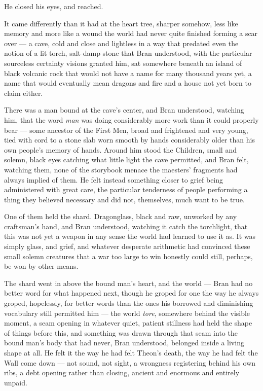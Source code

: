 He closed his eyes, and reached.

\sceneBreak

It came differently than it had at the heart tree, sharper somehow, less like memory and more like a wound the world had never quite finished forming a scar over — a cave, cold and close and lightless in a way that predated even the notion of a lit torch, salt-damp stone that Bran understood, with the particular sourceless certainty visions granted him, sat somewhere beneath an island of black volcanic rock that would not have a name for many thousand years yet, a name that would eventually mean dragons and fire and a house not yet born to claim either.

There was a man bound at the cave’s center, and Bran understood, watching him, that the word \textit{man} was doing considerably more work than it could properly bear — some ancestor of the First Men, broad and frightened and very young, tied with cord to a stone slab worn smooth by hands considerably older than his own people’s memory of hands. Around him stood the Children, small and solemn, black eyes catching what little light the cave permitted, and Bran felt, watching them, none of the storybook menace the maesters’ fragments had always implied of them. He felt instead something closer to grief being administered with great care, the particular tenderness of people performing a thing they believed necessary and did not, themselves, much want to be true.

One of them held the shard. Dragonglass, black and raw, unworked by any craftsman’s hand, and Bran understood, watching it catch the torchlight, that this was not yet a weapon in any sense the world had learned to use it as. It was simply glass, and grief, and whatever desperate arithmetic had convinced these small solemn creatures that a war too large to win honestly could still, perhaps, be won by other means.

The shard went in above the bound man’s heart, and the world — Bran had no better word for what happened next, though he groped for one the way he always groped, hopelessly, for better words than the ones his borrowed and diminishing vocabulary still permitted him — the world \textit{tore}, somewhere behind the visible moment, a seam opening in whatever quiet, patient stillness had held the shape of things before this, and something was drawn through that seam into the bound man’s body that had never, Bran understood, belonged inside a living shape at all. He felt it the way he had felt Theon’s death, the way he had felt the Wall come down — not sound, not sight, a wrongness registering behind his own ribs, a debt opening rather than closing, ancient and enormous and entirely unpaid.


